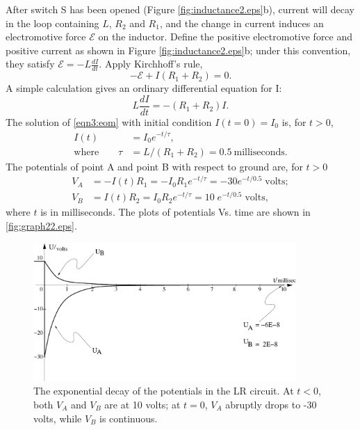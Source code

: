 \documentclass[makesolutionspdf]{esg8022pset}
\begin{document}
\begin{solution}
  After switch S has been opened (Figure \ref{fig:inductance2.eps}b),
  current will decay in the loop containing $L$, $R_2$ and $R_1$, and
  the change in current induces an electromotive force $\mathcal{E}$ on
  the inductor.  Define the positive electromotive force and positive
  current as shown in Figure \ref{fig:inductance2.eps}b; under this
  convention, they satisfy ${\mathcal{E}}=-L\frac{dI}{dt}$.  Apply
  Kirchhoff's rule,
  \begin{equation}
  -{\mathcal{E}}+I(R_1+R_2)=0.
  \end{equation}
  A simple calculation gives an ordinary differential equation for I:
  \begin{equation}\label{eqn3:eom}
  L\frac{dI}{dt}=-(R_1+R_2)I.
  \end{equation}
  The solution of \autoref{eqn3:eom} with initial condition
  $I(t=0)=I_0$ is, for $t>0$,
  \begin{align}
  I(t) & = I_0 e^{-t/\tau},\\
  \text{where}\qquad \tau & = L/(R_1+R_2)=0.5\: \text{milliseconds}.
  \end{align}
  The potentials of point A and point B with respect to ground are, for $t>0$
  \begin{align}
  V_A & = -I(t)R_1=-I_0 R_1 e^{-t/\tau}= -30e^{-t/0.5}\;\text{volts};\\
  V_B & = I(t)R_2=I_0 R_2 e^{-t/\tau}= 10\;e^{-t/0.5}\;\text{volts},
  \end{align}
  where $t$ is in milliseconds.  The plots of potentials Vs. time are
  shown in \autoref{fig:graph22.eps}.


  \begin{figure}[H]
    \centering
    \includegraphics[width = 10cm]{graph22}
    \caption{The exponential decay of the potentials in the LR circuit.
      At $t<0$, both $V_A$ and $V_B$ are at 10 volts; at $t=0$, $V_A$
      abruptly drops to -30 volts, while $V_B$ is continuous.}
    \label{fig:graph22.eps}
  \end{figure}



\end{solution}
\end{document}
